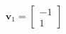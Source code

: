 \documentclass[preview]{standalone}
\begin{document}
\begin{align*}
\mathbf{v}_1 = \left[\begin{matrix}-1 \\1\end{matrix}\right]
\end{align*}
\end{document}
